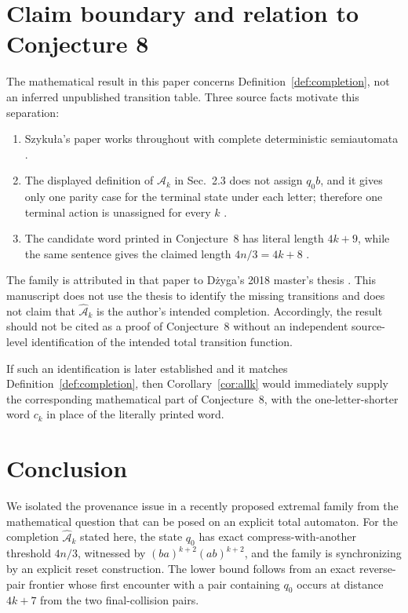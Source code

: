 \documentclass[11pt]{article}
\theoremstyle{definition}
\theoremstyle{remark}
\newcommand{\Ahat}{\widehat{\mathcal A}}
\begin{document}
\section{Claim boundary and relation to Conjecture 8}
The mathematical result in this paper concerns Definition~\ref{def:completion}, not an inferred unpublished transition table. Three source facts motivate this separation:
\begin{enumerate}[leftmargin=*]
\item Szyku\l a's paper works throughout with complete deterministic semiautomata \cite[Sec.~1.1]{Szykula2026}.
\item The displayed definition of $\mathcal A_k$ in Sec.~2.3 does not assign $q_0b$, and it gives only one parity case for the terminal state under each letter; therefore one terminal action is unassigned for every $k$ \cite[Sec.~2.3]{Szykula2026}.
\item The candidate word printed in Conjecture~8 has literal length $4k+9$, while the same sentence gives the claimed length $4n/3=4k+8$ \cite[Conj.~8]{Szykula2026}.
\end{enumerate}
The family is attributed in that paper to D\.{z}yga's 2018 master's thesis \cite{Dzyga2018}. This manuscript does not use the thesis to identify the missing transitions and does not claim that $\Ahat_k$ is the author's intended completion. Accordingly, the result should not be cited as a proof of Conjecture~8 without an independent source-level identification of the intended total transition function.

If such an identification is later established and it matches Definition~\ref{def:completion}, then Corollary~\ref{cor:allk} would immediately supply the corresponding mathematical part of Conjecture~8, with the one-letter-shorter word $c_k$ in place of the literally printed word.

\section{Conclusion}
We isolated the provenance issue in a recently proposed extremal family from the mathematical question that can be posed on an explicit total automaton. For the completion $\Ahat_k$ stated here, the state $q_0$ has exact compress-with-another threshold $4n/3$, witnessed by $(ba)^{k+2}(ab)^{k+2}$, and the family is synchronizing by an explicit reset construction. The lower bound follows from an exact reverse-pair frontier whose first encounter with a pair containing $q_0$ occurs at distance $4k+7$ from the two final-collision pairs.
\end{document}
